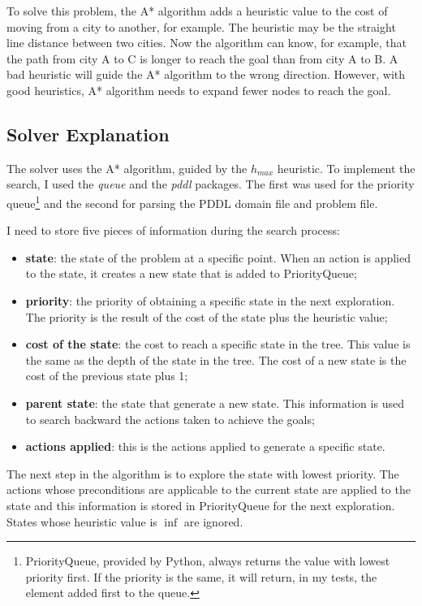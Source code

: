 \documentclass[letterpaper]{article}
\begin{document}
To solve this problem, the A* algorithm adds a heuristic value to the cost of moving from a city to another, for example. The heuristic may be the straight line distance between two cities. Now the algorithm can know, for example, that the path from city A to C is longer to reach the goal than from city A to B. A bad heuristic will guide the A* algorithm to the wrong direction. However, with good heuristics, A* algorithm needs to expand fewer nodes to reach the goal.

\subsection{Solver Explanation}

The solver uses the A* algorithm, guided by the $h_{max}$ heuristic. To implement the search, I used the \textit{queue} and the \textit{pddl} packages. The first was used for the priority queue\footnote{PriorityQueue, provided by Python, always returns the value with lowest priority first. If the priority is the same, it will return, in my tests, the element added first to the queue.} and the second for parsing the PDDL domain file and problem file.

I need to store five pieces of information during the search process:

\begin{itemize}
  \item \textbf{state}: the state of the problem at a specific point. When an action is applied to the state, it creates a new state that is added to PriorityQueue;
  \item \textbf{priority}: the priority of obtaining a specific state in the next exploration. The priority is the result of the cost of the state plus the heuristic value;
  \item \textbf{cost of the state}: the cost to reach a specific state in the tree. This value is the same as the depth of the state in the tree. The cost of a new state is the cost of the previous state plus 1;
  \item \textbf{parent state}: the state that generate a new state. This information is used to search backward the actions taken to achieve the goals;
  \item \textbf{actions applied}: this is the actions applied to generate a specific state.
\end{itemize}

The next step in the algorithm is to explore the state with lowest priority. The actions whose preconditions are applicable to the current state are applied to the state and this information is stored in PriorityQueue for the next exploration. States whose heuristic value is $\inf$ are ignored.
\end{document}
